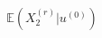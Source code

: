 \documentclass[preview]{standalone}
\begin{document}
\begin{align*}
\mathbb{E}(X^{(r)}_2|u^{(0)})
\end{align*}
\end{document}
